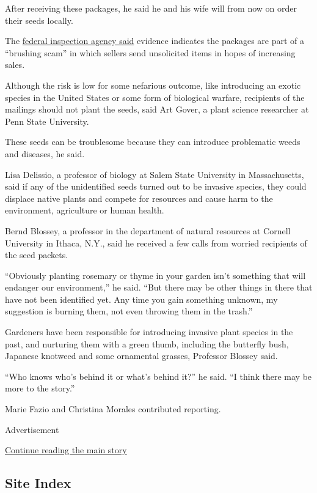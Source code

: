 After receiving these packages, he said he and his wife will from now on
order their seeds locally.

The
\href{https://www.aphis.usda.gov/aphis/newsroom/stakeholder-info/sa_by_date/sa-2020/sa-07/seeds-china}{federal
inspection agency said} evidence indicates the packages are part of a
``brushing scam'' in which sellers send unsolicited items in hopes of
increasing sales.

Although the risk is low for some nefarious outcome, like introducing an
exotic species in the United States or some form of biological warfare,
recipients of the mailings should not plant the seeds, said Art Gover, a
plant science researcher at Penn State University.

These seeds can be troublesome because they can introduce problematic
weeds and diseases, he said.

Lisa Delissio, a professor of biology at Salem State University in
Massachusetts, said if any of the unidentified seeds turned out to be
invasive species, they could displace native plants and compete for
resources and cause harm to the environment, agriculture or human
health.

Bernd Blossey, a professor in the department of natural resources at
Cornell University in Ithaca, N.Y., said he received a few calls from
worried recipients of the seed packets.

``Obviously planting rosemary or thyme in your garden isn't something
that will endanger our environment,'' he said. ``But there may be other
things in there that have not been identified yet. Any time you gain
something unknown, my suggestion is burning them, not even throwing them
in the trash.''

Gardeners have been responsible for introducing invasive plant species
in the past, and nurturing them with a green thumb, including the
butterfly bush, Japanese knotweed and some ornamental grasses, Professor
Blossey said.

``Who knows who's behind it or what's behind it?'' he said. ``I think
there may be more to the story.''

Marie Fazio and Christina Morales contributed reporting.

Advertisement

\protect\hyperlink{after-bottom}{Continue reading the main story}

\hypertarget{site-index}{%
\subsection{Site Index}\label{site-index}}

